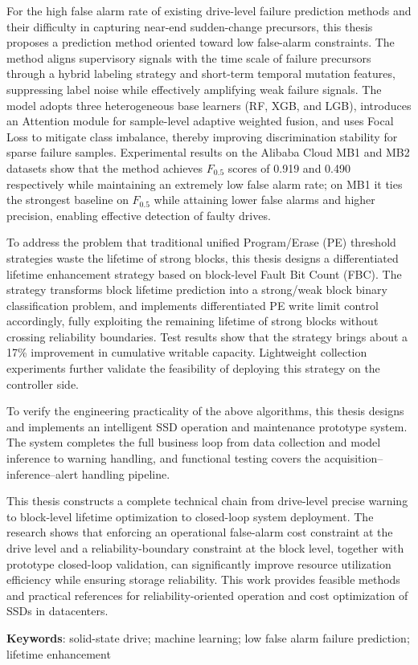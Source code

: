 For the high false alarm rate of existing drive-level failure prediction methods and their difficulty in capturing near-end sudden-change precursors, this thesis proposes a prediction method oriented toward low false-alarm constraints.
The method aligns supervisory signals with the time scale of failure precursors through a hybrid labeling strategy and short-term temporal mutation features, suppressing label noise while effectively amplifying weak failure signals.
The model adopts three heterogeneous base learners (RF, XGB, and LGB), introduces an Attention module for sample-level adaptive weighted fusion, and uses Focal Loss to mitigate class imbalance, thereby improving discrimination stability for sparse failure samples.
Experimental results on the Alibaba Cloud MB1 and MB2 datasets show that the method achieves $F_{0.5}$ scores of 0.919 and 0.490 respectively while maintaining an extremely low false alarm rate; on MB1 it ties the strongest baseline on $F_{0.5}$ while attaining lower false alarms and higher precision, enabling effective detection of faulty drives.

To address the problem that traditional unified Program/Erase (PE) threshold strategies waste the lifetime of strong blocks, this thesis designs a differentiated lifetime enhancement strategy based on block-level Fault Bit Count (FBC).
The strategy transforms block lifetime prediction into a strong/weak block binary classification problem, and implements differentiated PE write limit control accordingly, fully exploiting the remaining lifetime of strong blocks without crossing reliability boundaries.
Test results show that the strategy brings about a 17\% improvement in cumulative writable capacity.
Lightweight collection experiments further validate the feasibility of deploying this strategy on the controller side.

To verify the engineering practicality of the above algorithms, this thesis designs and implements an intelligent SSD operation and maintenance prototype system.
The system completes the full business loop from data collection and model inference to warning handling, and functional testing covers the acquisition--inference--alert handling pipeline.

This thesis constructs a complete technical chain from drive-level precise warning to block-level lifetime optimization to closed-loop system deployment.
The research shows that enforcing an operational false-alarm cost constraint at the drive level and a reliability-boundary constraint at the block level, together with prototype closed-loop validation, can significantly improve resource utilization efficiency while ensuring storage reliability.
This work provides feasible methods and practical references for reliability-oriented operation and cost optimization of SSDs in datacenters.


\textbf{Keywords}: solid-state drive; machine learning; low false alarm failure prediction; lifetime enhancement